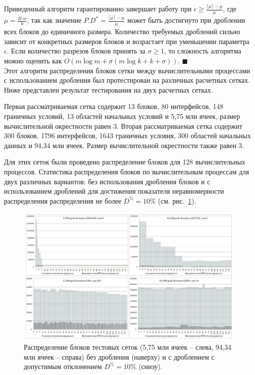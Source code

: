 Приведенный алгоритм гарантированно завершает работу при $\epsilon \ge \frac{\lceil \mu \rceil - \mu}{\mu}$, где $\mu = \frac{B.w}{k}$, так как значение $P.D^{*} = \frac{\lceil \mu \rceil - \mu}{\mu}$ может быть достигнуто при дроблении всех блоков до единичного размера.
Количество требуемых дроблений сильно зависит от конкретных размеров блоков и возрастает при уменьшении параметра $\epsilon$.
Если количество разрезов блоков принять за $\sigma \ge 1$, то сложность алгоритма можно оценить как $O(m \log m + \sigma(m \log k + k + \sigma))$.
$\blacksquare$\\

Этот алгоритм распределения блоков сетки между вычислительными процессами с использованием дробления был протестирован на различных расчетных сетках.
Ниже представлен результат тестирования на двух расчетных сетках.

Первая рассматриваемая сетка содержит 13 блоков, 80 интерфейсов, 148 граничных условий, 13 областей начальных условий и 5,75 млн ячеек, размер вычислительной окрестности равен 3.
Вторая рассматриваемая сетка содержит 300 блоков, 1796 интерфейсов, 1643 граничных условия, 300 областей начальных данных и 94,34 млн ячеек.
Размер вычислительной окрестности также равен 3.

Для этих сеток были проведено распределение блоков для 128 вычислительных процессов.
Статистика распределения блоков по вычислительным процессам для двух различных вариантов: без использования дробления блоков и с использованием дроблений для достижения показателя неравномерности распределения распределения не более $D^{\%} = 10\%$ (см. рис.~\ref{fig:text_2_withcut_charts}).

\begin{figure}[ht]
\centering
\includegraphics[width=1.0\textwidth]{fig/par_withcut-charts.pdf}
\singlespacing
{}\caption{Распределение блоков тестовых сеток (5,75 млн ячеек -- слева, 94,34 млн ячеек -- справа) без дробления (наверху) и с дроблением с допустимым отклонением $D^{\%} = 10\%$ (снизу).}
\label{fig:text_2_withcut_charts}
\end{figure}

